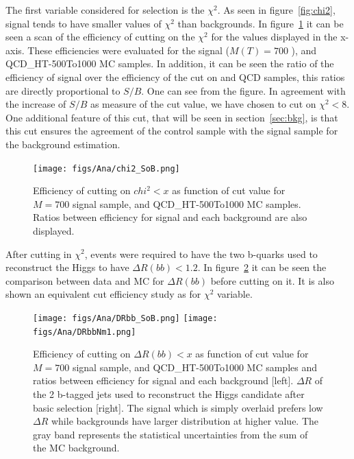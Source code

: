 The first variable considered for selection is the $\chi^{2}$. As seen in figure~\ref{fig:chi2}, signal tends to have smaller values of $\chi^{2}$ than backgrounds. In figure~\ref{fig:chi2cut} it can be seen a scan of the efficiency of cutting on the $\chi^{2}$ for the values displayed in the x-axis. These efficiencies were evaluated for the signal ($M(T)=700$ \GeVcc), \ttbar and QCD\_HT-500To1000 MC samples. In addition, it can be seen the ratio of the efficiency of signal over the efficiency of the cut on \ttbar and QCD samples, this ratios are directly proportional to $S/B$. One can see from the figure. In agreement with the increase of $S/B$ as measure of the cut value, we have chosen to cut on $\chi^{2}<8$. One additional feature of this cut, that will be seen in section~\ref{sec:bkg}, is that this cut ensures the agreement of the control sample with the signal sample for the background estimation. 

\begin{figure}[!Hhtbp]
  \begin{center}
    \texttt{[image: figs/Ana/chi2\_SoB.png]}
    \caption{Efficiency of cutting on $chi^{2}<x$ as function of cut value for $M=700$ \GeVcc signal sample, \ttbar and QCD\_HT-500To1000 MC samples. Ratios between efficiency for signal and each background are also displayed.}
    \label{fig:chi2cut}
  \end{center}
\end{figure}

After cutting in $\chi^{2}$, events were required to have the two b-quarks used to reconstruct the Higgs to have $\Delta R(bb)<1.2$. In figure~\ref{fig:DRbb} it can be seen the comparison between data and MC for $\Delta R(bb)$ before cutting on it. It is also shown an equivalent cut efficiency study as for $\chi^{2}$ variable. 

\begin{figure}[!Hhtbp]
  \begin{center}
    \texttt{[image: figs/Ana/DRbb\_SoB.png]}
    \texttt{[image: figs/Ana/DRbbNm1.png]}
    \caption{Efficiency of cutting on $\Delta R(bb)<x$ as function of cut value for $M=700$ \GeVcc signal sample, \ttbar and QCD\_HT-500To1000 MC samples and ratios between efficiency for signal and each background [left]. $\Delta R$ of the 2 b-tagged jets used to reconstruct the Higgs candidate after basic selection [right]. The signal which is simply overlaid prefers low $\Delta R$ while backgrounds have larger distribution at higher value. The gray band represents the statistical uncertainties from the sum of the MC background.}
    \label{fig:DRbb}
  \end{center}
\end{figure}

